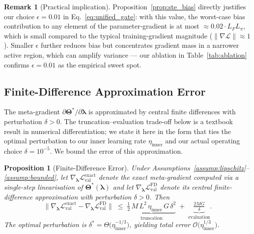 \documentclass[10pt]{article}
\theoremstyle{plain}
\newtheorem{proposition}{Proposition}
\theoremstyle{definition}
\newtheorem{remark}{Remark}
\begin{document}
\begin{remark}[Practical implication]
\label{rem:ste_choice}
Proposition~\ref{prop:ste_bias} directly justifies our choice
$\epsilon=0.01$ in Eq.~\eqref{eq:unified_gate}: with this value,
the worst-case bias contribution to any element of the
parameter-gradient is at most $\approx 0.02\cdot L_F L_\pi$, which
is small compared to the typical training-gradient magnitude
($\|\nabla\mathcal{L}\|\approx 1$). Smaller $\epsilon$ further
reduces bias but concentrates gradient mass in a narrower active
region, which can amplify variance --- our ablation in
Table~\ref{tab:ablation} confirms $\epsilon=0.01$ as the
empirical sweet spot.
\end{remark}

\subsection{Finite-Difference Approximation Error}
\label{sec:prop_fd}

The meta-gradient
$\partial\boldsymbol{\Theta}^{\!*}/\partial\boldsymbol{\lambda}$ is
approximated by central finite differences with perturbation
$\delta>0$. The truncation--evaluation trade-off below is a
textbook result in numerical differentiation; we state it here in
the form that ties the optimal perturbation to our inner learning
rate $\eta_{\mathrm{inner}}$ and our actual operating choice
$\delta\!=\!10^{-5}$. We bound the error of this approximation.

\begin{proposition}[Finite-Difference Error]
\label{prop:fd_bias}
Under Assumptions~\ref{assump:lipschitz}--\eqref{assump:bounded}, let
$\nabla_{\boldsymbol{\lambda}}\mathcal{L}_{\mathrm{val}}^{\mathrm{exact}}$
denote the exact meta-gradient computed via a single-step
linearisation of
$\boldsymbol{\Theta}^{\!*}(\boldsymbol{\lambda})$ and let
$\nabla_{\boldsymbol{\lambda}}\mathcal{L}_{\mathrm{val}}^{\mathrm{FD}}$
denote its central finite-difference approximation with
perturbation $\delta>0$. Then
\begin{equation}
\big\|\nabla_{\boldsymbol{\lambda}}\mathcal{L}_{\mathrm{val}}^{\mathrm{exact}}
- \nabla_{\boldsymbol{\lambda}}\mathcal{L}_{\mathrm{val}}^{\mathrm{FD}}\big\|
\;\le\;
\underbrace{\tfrac{1}{2}\,M\,L^{2}\,\eta_{\mathrm{inner}}\,G\,\delta^{2}}_{\text{truncation}}
\;+\;
\underbrace{\tfrac{2MG}{\delta}}_{\text{evaluation}}.
\label{eq:fd_bias}
\end{equation}
The optimal perturbation is
$\delta^{\!*}=\Theta\!\big(\eta_{\mathrm{inner}}^{-1/3}\big)$,
yielding total error
$\mathcal{O}\!\big(\eta_{\mathrm{inner}}^{1/3}\big)$.
\end{proposition}
\end{document}
